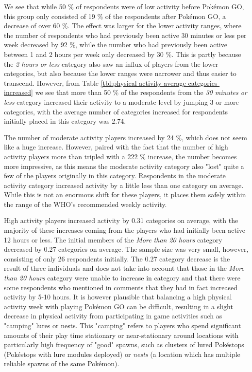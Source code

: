 We see that while 50 \% of respondents were of low activity before Pokémon GO, this group only consisted of 19 \% of the respondents after Pokémon GO, a decrease of over 60 \%. The effect was larger for the lower activity ranges, where the number of respondents who had previously been active 30 minutes or less per week decreased by 92 \%, while the number who had previously been active between 1 and 2 hours per week only decreased by 30 \%. This is partly because the \emph{2 hours or less} category also saw an influx of players from the lower categories, but also because the lower ranges were narrower and thus easier to transcend. However, from Table \ref{tbl:physical-activity-average-categories-increased} we see that more than 50 \% of the respondents from the \emph{30 minutes or less} category increased their activity to a moderate level by jumping 3 or more categories, with the average number of categories increased for respondents initially placed in this category was 2.74.

The number of moderate activity players increased by 24 \%, which does not seem like a huge increase. However, paired with the fact that the number of high activity players more than tripled with a 222 \% increase, the number becomes more impressive, as this means the moderate activity category also "lost" quite a few of the players originally in this category. Respondents in the moderate activity category increased activity by a little less than one category on average. While this is not an enormous shift for these players, it places them safely within the range of the WHO's recommended weekly activity.

High activity players increased activity by 0.31 categories on average, with the majority of these increases coming from the players who had initially been active 12 hours or less. The initial members of the \emph{More than 20 hours} category decreased by 0.27 categories on average. The sample size was very small, however, consisting of only 26 respondents initially. The 0.27 category decrease is the result of three individuals and does not take into account that those in the \emph{More than 20 hours} category were unable to increase in category and that there were some respondents who mentioned in comments that they had in fact increased activity by 5-10 hours. It is however plausible that balancing a high physical activity week with playing Pokémon GO can be difficult, resulting in a slight decrease in physical activity from participating in game activities such as "camping" lures or nests. This "camping" refers to players who spend significant amounts of their play time stationary or near-stationary around locations with particularly high frequency of "good" spawns, such as clusters of lured Pokéstops (Pokéstops with lure modules deployed) or \emph{nests} (a location which has multiple reliable spawns of the same Pokémon).

